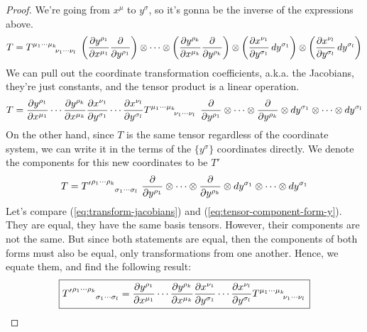 \begin{solution_pset}
\begin{proof}
		We're going from $x^\mu$ to $y^\sigma$, so it's gonna be the 
		inverse of the expressions above.
		\[
			T 
			=
			T\indices{^{\mu_1\cdots \mu_k}_{\nu_1\cdots\nu_l}}\ 
			\pqty{
				\pdv{
					y^{\rho_1}
				}{
					x^{\mu_1}
				}
				\pdv{}{
					y^{\rho_1}
				} 
			}
			\otimes
			\cdots
			\otimes
			\pqty{
				\pdv{
					y^{\rho_k}
				}{
					x^{\mu_k}
				}
				\pdv{}{
					y^{\rho_k}
				} 
			}
			\otimes
			\pqty{
				\pdv{x^{\nu_1}}{y^{\sigma_1}}
				\dd{y^{\sigma_1}} 
			}
			\otimes
			\pqty{
				\pdv{x^{\nu_l}}{y^{\sigma_l}}
				\dd{y^{\sigma_l}} 
			}
		\]
			We can pull out the coordinate transformation coefficients, a.k.a. the Jacobians,
			they're just constants, and the tensor product is a linear operation.
			\begin{equation}
				\label{eq:transform-jacobians}
				T 
				=
					\pdv{
						y^{\rho_1}
					}{
						x^{\mu_1}
					}
					\cdots
					\pdv{
						y^{\rho_k}
					}{
						x^{\mu_k}
					}
					\pdv{x^{\nu_1}}{y^{\sigma_1}}
					\cdots
					\pdv{x^{\nu_l}}{y^{\sigma_l}}
				T\indices{^{\mu_1\cdots \mu_k}_{\nu_1\cdots\nu_l}}\ 
					\pdv{}{y^{\rho_1}} 
				\otimes
				\cdots
				\otimes
					\pdv{}{y^{\rho_k}} 
				\otimes
					\dd{y^{\sigma_1}} 
				\otimes
				\cdots
				\otimes
					\dd{y^{\sigma_l}} 
			\end{equation}
		On the other hand, since $T$ is the same tensor regardless
		of the coordinate system, we can write it in the terms of the $\{y^\sigma\}$
		coordinates directly. We denote the components for this new coordinates to be 
		$T'$
		\begin{equation}
			\label{eq:tensor-component-form-y}
			T = 
			{T'}\indices{^{\rho_1 \cdots \rho_k}_{\sigma_1\cdots\sigma_l}}\ 
			\pdv{}{y^{\rho_1}} \otimes \cdots \otimes \pdv{}{y^{\rho_k}} 
			\otimes
			\dd{y^{\sigma_1}}\otimes \cdots \otimes \dd{y^{\sigma_1}}
		\end{equation}
		Let's compare (\ref{eq:transform-jacobians}) and (\ref{eq:tensor-component-form-y}).
		They are equal, they have the same basis tensors. However, their components are not the same.
		But since both statements are equal, then the components of both forms must also
		be equal, only transformations from one another. Hence, we equate them, and find the following result:
		\begin{equation}
			\label{eq:tensor-component-transform}
			\boxed{
				{T'}\indices{^{\rho_1 \cdots \rho_k}_{\sigma_1\cdots\sigma_l}} 
				=
				\pdv{
					y^{\rho_1}
				}{
					x^{\mu_1}
				}
				\cdots
				\pdv{
					y^{\rho_k}
				}{
					x^{\mu_k}
				}
				\pdv{x^{\nu_1}}{y^{\sigma_1}}
				\cdots
				\pdv{x^{\nu_l}}{y^{\sigma_l}}
				T\indices{^{{\mu_1}\cdots{\mu_k}}_{{\nu_1}\cdots{\nu_l}}} 
			}
		\end{equation}


\end{proof}
\end{solution_pset}
